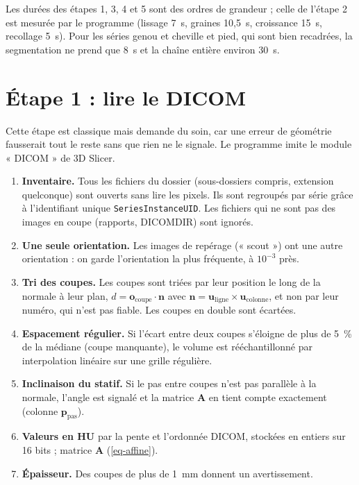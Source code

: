 \documentclass[11pt,a4paper]{article}
\newcommand{\vb}[1]{\mathbf{#1}}
\begin{document}
Les durées des étapes 1, 3, 4 et 5 sont des ordres de grandeur ; celle de l'étape 2 est mesurée par le programme
(lissage 7~s, graines 10,5~s, croissance 15~s, recollage 5~s). Pour les séries genou et cheville et pied, qui sont
bien recadrées, la segmentation ne prend que 8~s et la chaîne entière environ 30~s.

\section{Étape 1 : lire le DICOM}
\label{sec-lecture}

Cette étape est classique mais demande du soin, car une erreur de géométrie fausserait tout le reste sans que rien ne
le signale. Le programme imite le module « DICOM » de 3D Slicer.

\begin{enumerate}
  \item \textbf{Inventaire.} Tous les fichiers du dossier (sous-dossiers compris, extension quelconque) sont ouverts
  sans lire les pixels. Ils sont regroupés par série grâce à l'identifiant unique \texttt{SeriesInstanceUID}. Les
  fichiers qui ne sont pas des images en coupe (rapports, DICOMDIR) sont ignorés.
  \item \textbf{Une seule orientation.} Les images de repérage (« scout ») ont une autre orientation : on garde
  l'orientation la plus fréquente, à $10^{-3}$ près.
  \item \textbf{Tri des coupes.} Les coupes sont triées par leur position le long de la normale à leur plan,
  $d = \vb{o}_{\text{coupe}} \cdot \vb{n}$ avec $\vb{n} = \vb{u}_{\text{ligne}} \times \vb{u}_{\text{colonne}}$, et non par
  leur numéro, qui n'est pas fiable. Les coupes en double sont écartées.
  \item \textbf{Espacement régulier.} Si l'écart entre deux coupes s'éloigne de plus de 5~\% de la médiane (coupe
  manquante), le volume est rééchantillonné par interpolation linéaire sur une grille régulière.
  \item \textbf{Inclinaison du statif.} Si le pas entre coupes n'est pas parallèle à la normale, l'angle est signalé
  et la matrice $\vb{A}$ en tient compte exactement (colonne $\vb{p}_{\text{pas}}$).
  \item \textbf{Valeurs en HU} par la pente et l'ordonnée DICOM, stockées en entiers sur 16 bits ; matrice $\vb{A}$
  (\cref{eq-affine}).
  \item \textbf{Épaisseur.} Des coupes de plus de 1~mm donnent un avertissement.
\end{enumerate}
\end{document}
